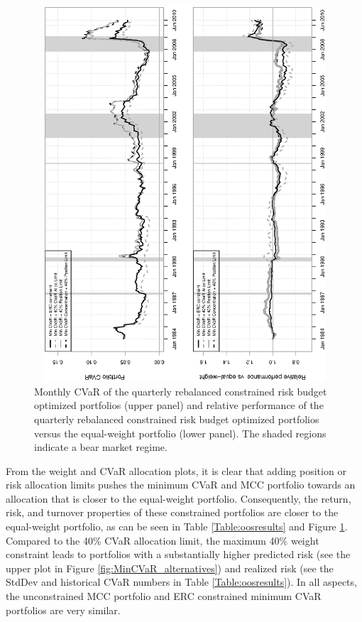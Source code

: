 \documentclass[12pt,a4paper]{article}
\begin{document}
\begin{figure}[tb]
\begin{center}
\caption{Monthly CVaR of the quarterly rebalanced constrained risk budget optimized portfolios (upper panel) and relative performance of the quarterly rebalanced constrained risk budget optimized portfolios versus the equal-weight portfolio (lower panel). The shaded regions indicate a bear market regime. \label{fig:relperformance_alternatives}  }
\includegraphics[width=12cm,height=14cm,angle=270]{portfolioCVaRRelPerf_CC_alternatives.eps}
\end{center}
\end{figure}

From the weight and CVaR allocation plots, it is clear that adding position or risk allocation limits pushes the minimum CVaR and MCC portfolio towards an allocation that is closer to the equal-weight portfolio. Consequently, the return, risk, and turnover properties of these constrained portfolios are closer to the equal-weight portfolio, as can be seen in Table \ref{Table:oosresults} and Figure \ref{fig:relperformance_alternatives}. Compared to the 40\% CVaR allocation limit, the maximum 40\% weight constraint leads to portfolios with a substantially higher predicted risk (see the upper plot in Figure \ref{fig:MinCVaR_alternatives}) and realized risk (see the StdDev and historical CVaR numbers in Table \ref{Table:oosresults}). In all aspects, the unconstrained MCC portfolio and ERC constrained minimum CVaR portfolios are very similar.
\end{document}
